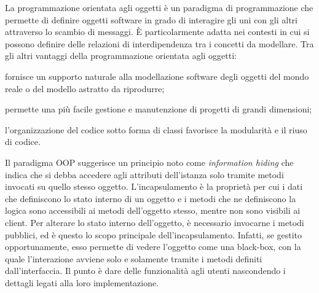 La programmazione orientata agli oggetti è un paradigma di
programmazione che permette di definire oggetti software in grado di interagire
gli uni con gli altri attraverso lo scambio di messaggi.
È particolarmente adatta nei contesti in cui si possono definire delle relazioni
di interdipendenza tra i concetti da modellare.
Tra gli altri vantaggi della programmazione orientata agli oggetti:
\begin{enumerate*}[label={\alph*)},font={\bfseries}]
\item fornisce un supporto naturale alla modellazione software degli oggetti del
mondo reale o del modello astratto da riprodurre;
\item permette una più facile gestione e manutenzione di progetti di grandi
dimensioni;
\item l'organizzazione del codice sotto forma di classi favorisce la modularità
e il riuso di codice.
\end{enumerate*}
Il paradigma OOP suggerisce un principio noto come \emph{information hiding} che
indica che si debba accedere agli attributi dell'istanza solo tramite metodi
invocati su quello stesso oggetto.
L'incapsulamento è la proprietà per cui i dati che definiscono lo stato interno
di un oggetto e i metodi che ne definiscono la logica sono accessibili ai metodi
dell'oggetto stesso, mentre non sono visibili ai client. Per alterare lo stato
interno dell'oggetto, è necessario invocarne i metodi pubblici, ed è questo lo
scopo principale dell'incapsulamento. Infatti, se gestito opportunamente, esso
permette di vedere l'oggetto come una black-box, con la quale l'interazione
avviene solo e solamente tramite i metodi definiti dall'interfaccia.
Il punto è dare delle funzionalità agli utenti nascondendo i dettagli legati
alla loro implementazione.\cite{cox1991object}
